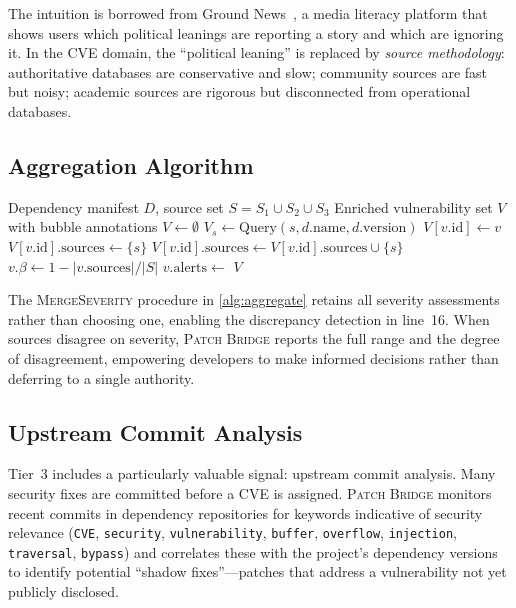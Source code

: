 \documentclass[11pt,twocolumn]{article}
\begin{document}
The intuition is borrowed from Ground News~\cite{groundnews}, a media
literacy platform that shows users which political leanings are
reporting a story and which are ignoring it. In the CVE domain, the
``political leaning'' is replaced by \emph{source methodology}:
authoritative databases are conservative and slow; community sources
are fast but noisy; academic sources are rigorous but disconnected
from operational databases.

\subsection{Aggregation Algorithm}

\begin{algorithm}[t]
\caption{Multi-source CVE aggregation with bubble detection}
\label{alg:aggregate}
\begin{algorithmic}[1]
\Require Dependency manifest $D$, source set $S = S_1 \cup S_2 \cup S_3$
\Ensure Enriched vulnerability set $V$ with bubble annotations
\State $V \gets \emptyset$
    \State $V_s \gets \text{Query}(s, d.\text{name}, d.\text{version})$
        \State $V[v.\text{id}] \gets v$
        \State $V[v.\text{id}].\text{sources} \gets \{s\}$
      \Else
        \State $V[v.\text{id}].\text{sources} \gets V[v.\text{id}].\text{sources} \cup \{s\}$
        \State {}
      \EndIf
    \EndFor
  \EndFor
\EndFor
{}
  \State $v.\beta \gets 1 - |v.\text{sources}| / |S|$
  \State $v.\text{alerts} \gets$ 
\EndFor
\State \Return $V$
\end{algorithmic}
\end{algorithm}

The \textsc{MergeSeverity} procedure in \cref{alg:aggregate} retains
all severity assessments rather than choosing one, enabling the
discrepancy detection in line~16. When sources disagree on severity,
\textsc{Patch Bridge} reports the full range and the degree of
disagreement, empowering developers to make informed decisions rather
than deferring to a single authority.

\subsection{Upstream Commit Analysis}

Tier~3 includes a particularly valuable signal: upstream commit
analysis. Many security fixes are committed before a CVE is assigned.
\textsc{Patch Bridge} monitors recent commits in dependency repositories
for keywords indicative of security relevance (\texttt{CVE},
\texttt{security}, \texttt{vulnerability}, \texttt{buffer},
\texttt{overflow}, \texttt{injection}, \texttt{traversal},
\texttt{bypass}) and correlates these with the project's dependency
versions to identify potential ``shadow fixes''---patches that address
a vulnerability not yet publicly disclosed.
\end{document}
